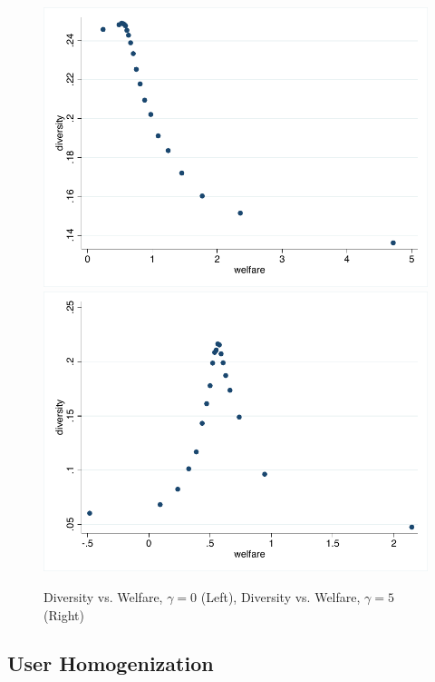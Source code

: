 \documentclass[sigconf]{acmart}
\begin{document}
\begin{figure}
\includegraphics[scale=0.3]{figures/diversity_welfare_no_risk_aversion}
\includegraphics[scale=0.3]{figures/diversity_welfare_high_ra}
\caption{Diversity vs. Welfare, $\gamma = 0$ (Left), Diversity vs. Welfare, $\gamma = 5$ (Right)}
\label{fig:diversity_welfare_ra}
\end{figure}

\subsection{User Homogenization}
\end{document}
